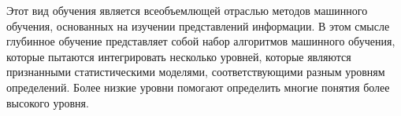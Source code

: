 \begin{frame}

    Этот вид обучения является всеобъемлющей отраслью методов машинного обучения,
    основанных на изучении представлений информации.
    В этом смысле глубинное обучение представляет собой набор алгоритмов машинного обучения,
    которые пытаются интегрировать несколько уровней,
    которые являются признанными статистическими моделями, соответствующими разным уровням определений.
    Более низкие уровни помогают определить многие понятия более высокого уровня.

\end{frame}